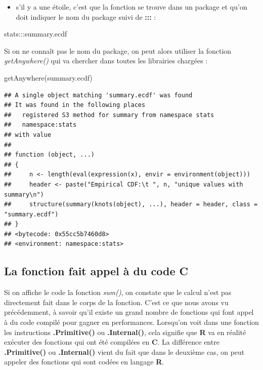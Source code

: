 \documentclass[
]{book}
\newenvironment{Shaded}{\begin{snugshade}}{\end{snugshade}}
\newcommand{\FunctionTok}[1]{\textcolor[rgb]{0.00,0.00,0.00}{#1}}
\newcommand{\NormalTok}[1]{#1}
\newcommand{\SpecialCharTok}[1]{\textcolor[rgb]{0.00,0.00,0.00}{#1}}
\providecommand{\tightlist}{%
  \setlength{\itemsep}{0pt}\setlength{\parskip}{0pt}}
\theoremstyle{definition}
\theoremstyle{definition}
\theoremstyle{definition}
\theoremstyle{definition}
\theoremstyle{remark}
\begin{document}
\begin{itemize}
\tightlist
\item
  s'il y a une étoile, c'est que la fonction se trouve dans un package et qu'on doit indiquer le nom du package suivi de \textbf{:::} :
\end{itemize}

\begin{Shaded}
\begin{Highlighting}[]
\NormalTok{stats}\SpecialCharTok{:::}\NormalTok{summary.ecdf}
\end{Highlighting}
\end{Shaded}

Si on ne connaît pas le nom du package, on peut alors utiliser la fonction \emph{getAnywhere()} qui va chercher dans toutes les librairies chargées :

\begin{Shaded}
\begin{Highlighting}[]
\FunctionTok{getAnywhere}\NormalTok{(summary.ecdf)}
\end{Highlighting}
\end{Shaded}

\begin{verbatim}
## A single object matching 'summary.ecdf' was found
## It was found in the following places
##   registered S3 method for summary from namespace stats
##   namespace:stats
## with value
## 
## function (object, ...) 
## {
##     n <- length(eval(expression(x), envir = environment(object)))
##     header <- paste("Empirical CDF:\t ", n, "unique values with summary\n")
##     structure(summary(knots(object), ...), header = header, class = "summary.ecdf")
## }
## <bytecode: 0x55cc5b7460d8>
## <environment: namespace:stats>
\end{verbatim}

\hypertarget{la-fonction-fait-appel-uxe0-du-code-c}{%
\subsection{\texorpdfstring{La fonction fait appel à du code \textbf{C}}{La fonction fait appel à du code C}}\label{la-fonction-fait-appel-uxe0-du-code-c}}

Si on affiche le code la fonction \emph{sum()}, on constate que le calcul n'est pas directement fait dans le corps de la fonction. C'est ce que nous avons vu précédemment, à savoir qu'il existe un grand nombre de fonctions qui font appel à du code compilé pour gagner en performances. Lorsqu'on voit dans une fonction les instructions \textbf{.Primitive()} ou \textbf{.Internal()}, cela signifie que \textbf{R} va en réalité exécuter des fonctions qui ont été compilées en \textbf{C}. La différence entre \textbf{.Primitive()} ou \textbf{.Internal()} vient du fait que dans le deuxième cas, on peut appeler des fonctions qui sont codées en langage \textbf{R}.
\end{document}
